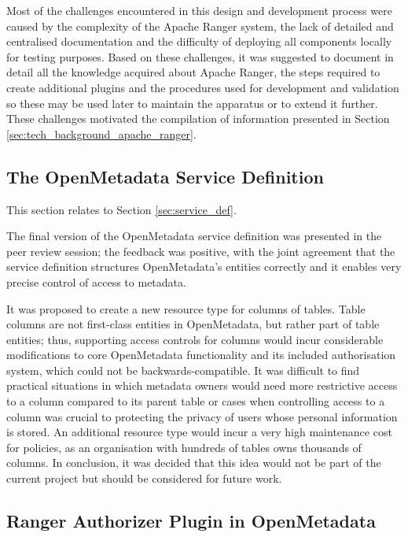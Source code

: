 Most of the challenges encountered in this design and development process were caused by the complexity of the Apache Ranger system, the lack of detailed and centralised documentation and the difficulty of deploying all components locally for testing purposes. Based on these challenges, it was suggested to document in detail all the knowledge acquired about Apache Ranger, the steps required to create additional plugins and the procedures used for development and validation so these may be used later to maintain the apparatus or to extend it further. These challenges motivated the compilation of information presented in Section \ref{sec:tech_background_apache_ranger}.

\subsection{The OpenMetadata Service Definition}

This section relates to Section \ref{sec:service_def}.

The final version of the OpenMetadata service definition was presented in the peer review session; the feedback was positive, with the joint agreement that the service definition structures OpenMetadata's entities correctly and it enables very precise control of access to metadata.

It was proposed to create a new resource type for columns of tables. Table columns are not first-class entities in OpenMetadata, but rather part of table entities; thus, supporting access controls for columns would incur considerable modifications to core OpenMetadata functionality and its included authorisation system, which could not be backwards-compatible. It was difficult to find practical situations in which metadata owners would need more restrictive access to a column compared to its parent table or cases when controlling access to a column was crucial to protecting the privacy of users whose personal information is stored. An additional resource type would incur a very high maintenance cost for policies, as an organisation with hundreds of tables owns thousands of columns. In conclusion, it was decided that this idea would not be part of the current project but should be considered for future work.

\subsection{Ranger Authorizer Plugin in OpenMetadata}

